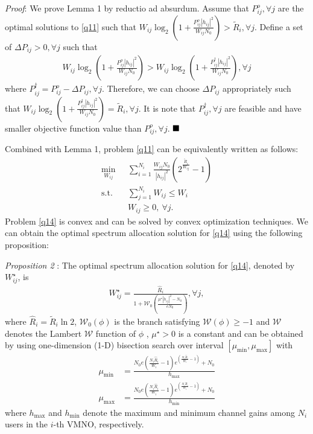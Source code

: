 \documentclass[journal]{IEEEtran}
\begin{document}
\textit{Proof}:  
We prove Lemma 1 by reductio ad absurdum. Assume that $P_{ij}^o, \forall j$ are the optimal solutions to \eqref{q11} such that $W_{ij}\log_2\left(1 + \frac{P_{ij}^o\left|h_{ij}\right|^2}{W_{ij}N_0}\right) > \tilde{R}_i, \forall j$. Define a set of $\Delta P_{ij} > 0, \forall j$ such that 
\begin{align}
W_{ij}\log_2\left(1 + \frac{P_{ij}^o\left|h_{ij}\right|^2}{W_{ij}N_0}\right) > W_{ij}\log_2\left(1 + \frac{P_{ij}^\dag\left|h_{ij}\right|^2}{W_{ij}N_0}\right), \forall j
\end{align}
where $P_{ij}^\dag = P_{ij}^o - \Delta P_{ij}, \forall j$. Therefore, we can choose $\Delta P_{ij}$ appropriately such that $W_{ij}\log_2\left(1 + \frac{P_{ij}^\dag\left|h_{ij}\right|^2}{W_{ij}N_0}\right) = \tilde{R}_i, \forall j$. It is note that $P_{ij}^\dag, \forall j$ are feasible and have smaller objective function value than $P_{ij}^o, \forall j$.
$\hfill\blacksquare$

Combined with Lemma 1, problem \eqref{q11} can be equivalently written as follows:
\begin{subequations}\label{q14}
	\begin{align}
	\min_{W_{ij}}\ & \sum\limits_{i = 1}^{N_i} \frac{W_{ij}N_0}{\left|h_{ij}\right|^2}\left(2^{\frac{\tilde{R}_i}{W_{ij}}} - 1\right) \label{q14a} \\ \mbox{s.t.} \quad &  \sum\limits_{j = 1}^{N_i} W_{ij} \leq W_i \label{q14b} \\
	& W_{ij} \geq 0, \ \forall j. \label{q14c}
	\end{align}
\end{subequations}
Problem \eqref{q14} is convex and can be solved by convex optimization techniques. We can obtain the optimal spectrum allocation solution for \eqref{q14} using the following proposition:

\textit{Proposition 2} : The optimal spectrum allocation solution for \eqref{q14}, denoted by $W_{ij}^\star$, is
\begin{align}
W_{ij}^\star = \frac{\hat{R}_i}{1 + \mathcal{W}_0\left(\frac{\mu^{\star}\left|h_{ij}\right|^2 - N_0}{eN_0}\right)}, \forall j,
\end{align}
where $\hat{R}_i = \tilde{R}_i\ln2$, $\mathcal{W}_0\left(\phi\right)$ is the branch satisfying $\mathcal{W}\left(\phi\right) \geq -1$ and $\mathcal{W}$ denotes the Lambert $\mathcal{W}$ function of $\phi$ \cite{RMCorless}, $\mu^{\star} > 0$ is a constant and can be obtained by using one-dimension (1-D) bisection search over interval $\left[\mu_{\mbox{min}}, \mu_{\mbox{max}}\right]$ with
\begin{align}
\mu_{\mbox{min}} &= \frac{N_0e\left(\frac{N_i\hat{R}_i}{W_i} - 1\right)e^{\left(\frac{N_i\hat{R}_i}{W_i} - 1\right)} + N_0}{h_{\mbox{max}}}  \\
\mu_{\mbox{max}} & = \frac{N_0e\left(\frac{N_i\hat{R}_i}{W_i} - 1\right)e^{\left(\frac{N_i\hat{R}_i}{W_i} - 1\right)} + N_0}{h_{\mbox{min}}}
\end{align}
where $h_{\mbox{max}}$ and $h_{\mbox{min}}$ denote the maximum and minimum channel gains among $N_i$ users in the $i$-th VMNO, respectively.
\end{document}
